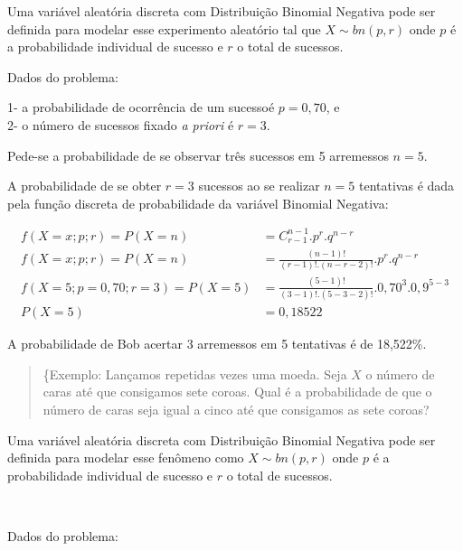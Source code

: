 \documentclass[
]{book}
\begin{document}
\hfill\break

Uma variável aleatória discreta com Distribuição Binomial Negativa pode ser definida para modelar esse experimento aleatório tal que \(X\sim bn(p,r)\) onde \(p\) é a probabilidade individual de sucesso e \(r\) o total de sucessos.

\hfill\break

Dados do problema:

\hfill\break

1- a probabilidade de ocorrência de um sucessoé \(p=0,70\), e\\
2- o número de sucessos fixado \emph{a priori} é \(r=3\).

\hfill\break

Pede-se a probabilidade de se observar três sucessos em 5 arremessos \(n=5\).

\hfill\break

A probabilidade de se obter \(r=3\) sucessos ao se realizar \(n=5\) tentativas é dada pela função discreta de probabilidade da variável Binomial Negativa:

\hfill\break

\begin{align*}
f(X=x; p; r) = P(X=n) & = {C}_{r-1}^{n-1} . {p}^{r}. {q}^{n-r} \\
f(X=x; p; r) = P(X=n) & = \frac{(n-1)!}{ (r-1)!. (n-r-2)!} . {p}^{r}. {q}^{n-r} \\
f(X=5; p=0,70 ; r=3) = P(X=5) & = \frac{(5-1)!}{ (3-1)!. (5-3-2)!} . {0,70}^{3}. {0,9}^{5-3} \\
P(X=5) & = 0,18522
\end{align*}

A probabilidade de Bob acertar 3 arremessos em 5 tentativas é de 18,522\%.

\hfill\break

\begin{quote}
\{Exemplo: Lançamos repetidas vezes uma moeda. Seja \(X\) o número de caras até que consigamos sete coroas. Qual é a probabilidade de que o número de caras seja igual a cinco até que consigamos as sete coroas?
\end{quote}

\hfill\break

Uma variável aleatória discreta com Distribuição Binomial Negativa pode ser definida para modelar esse fenômeno como \(X\sim bn(p,r)\) onde \(p\) é a probabilidade individual de sucesso e \(r\) o total de sucessos.

~

Dados do problema:
\end{document}
